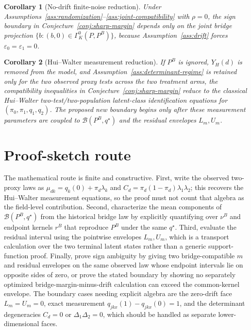 \documentclass[11pt]{article}
\theoremstyle{definition}
\theoremstyle{plain}
\newtheorem{corollary}{Corollary}
\theoremstyle{remark}
\begin{document}
\begin{corollary}[No-drift finite-noise reduction]\label{cor:no-drift-noisy}
Under Assumptions~\ref{ass:randomization}--\ref{ass:joint-compatibility} with \(\rho=0\), the sign boundary in Conjecture~\ref{conj:sharp-margin} depends only on the joint bridge projection \(\{b:(b,0)\in\Gamma_K^0(P,P^B)\}\), because Assumption~\ref{ass:drift} forces \(\varepsilon_0=\varepsilon_1=0\).
\end{corollary}

\begin{corollary}[Hui--Walter measurement reduction]\label{cor:hui-walter}
If \(P^B\) is ignored, \(Y_H(d)\) is removed from the model, and Assumption~\ref{ass:determinant-regime} is retained only for the two observed proxy tests across the two treatment arms, the compatibility inequalities in Conjecture~\ref{conj:sharp-margin} reduce to the classical Hui--Walter two-test/two-population latent-class identification equations for \((\pi_0,\pi_1,q_1,q_2)\).  The proposed new boundary begins only after these measurement parameters are coupled to \(\mathcal{B}(P^B,q^\star)\) and the residual envelopes \(L_m,U_m\).
\end{corollary}

\section{Proof-sketch route}
The mathematical route is finite and constructive.  First, write the observed two-proxy laws as \(\mu_{dk}=q_k(0)+\pi_d\lambda_k\) and \(C_d=\pi_d(1-\pi_d)\lambda_1\lambda_2\); this recovers the Hui--Walter measurement equations, so the proof must not count that algebra as the field-level contribution.  Second, characterize the mean components of \(\mathcal{B}(P^B,q^\star)\) from the historical bridge law by explicitly quantifying over \(\nu^B\) and endpoint kernels \(r^B\) that reproduce \(P^B\) under the same \(q^\star\).  Third, evaluate the residual interval using the pointwise envelopes \(L_m,U_m\), which is a transport calculation over the two terminal latent states rather than a generic support-function proof.  Finally, prove sign ambiguity by giving two bridge-compatible \(m\) and residual envelopes on the same observed law whose endpoint intervals lie on opposite sides of zero, or prove the stated boundary by showing no separately optimized bridge-margin-minus-drift calculation can exceed the common-kernel envelope.  The boundary cases needing explicit algebra are the zero-drift face \(L_m=U_m=0\), exact measurement \(q_{jkx}(1)-q_{jkx}(0)=1\), and the determinant degeneracies \(C_d=0\) or \(\Delta_1\Delta_2=0\), which should be handled as separate lower-dimensional faces.
\end{document}
